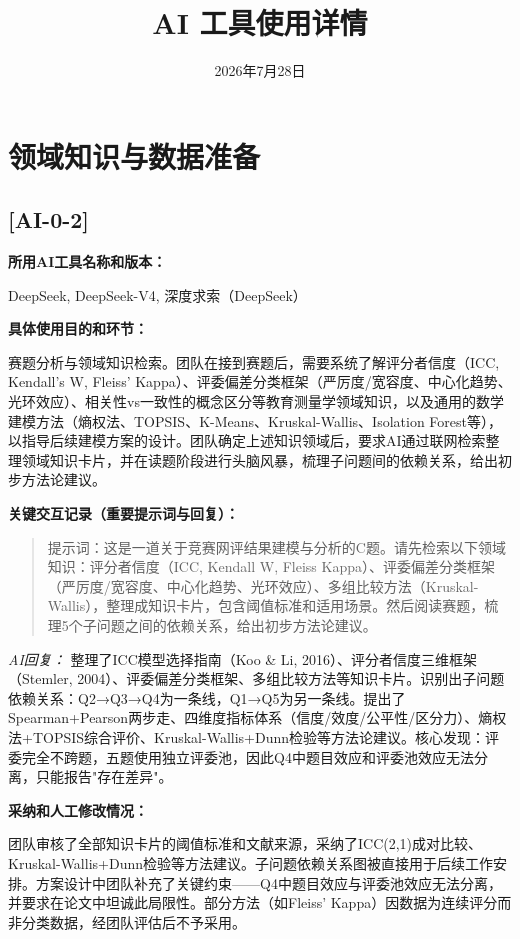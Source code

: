 \documentclass[12pt,a4paper]{ctexart}
\title{AI 工具使用详情}
\author{}
\date{2026年7月28日}
\begin{document}
\maketitle

\section*{领域知识与数据准备}

\subsection*{[AI-0-2]}

\textbf{所用AI工具名称和版本：}\par
DeepSeek, DeepSeek-V4, 深度求索（DeepSeek）

\textbf{具体使用目的和环节：}\par
赛题分析与领域知识检索。团队在接到赛题后，需要系统了解评分者信度（ICC, Kendall's W, Fleiss' Kappa）、评委偏差分类框架（严厉度/宽容度、中心化趋势、光环效应）、相关性vs一致性的概念区分等教育测量学领域知识，以及通用的数学建模方法（熵权法、TOPSIS、K-Means、Kruskal-Wallis、Isolation Forest等），以指导后续建模方案的设计。团队确定上述知识领域后，要求AI通过联网检索整理领域知识卡片，并在读题阶段进行头脑风暴，梳理子问题间的依赖关系，给出初步方法论建议。

\textbf{关键交互记录（重要提示词与回复）：}\par

\begin{quote}
提示词：这是一道关于竞赛网评结果建模与分析的C题。请先检索以下领域知识：评分者信度（ICC, Kendall W, Fleiss Kappa）、评委偏差分类框架（严厉度/宽容度、中心化趋势、光环效应）、多组比较方法（Kruskal-Wallis），整理成知识卡片，包含阈值标准和适用场景。然后阅读赛题，梳理5个子问题之间的依赖关系，给出初步方法论建议。
\end{quote}

\textit{AI回复：} 整理了ICC模型选择指南（Koo \& Li, 2016）、评分者信度三维框架（Stemler, 2004）、评委偏差分类框架、多组比较方法等知识卡片。识别出子问题依赖关系：Q2→Q3→Q4为一条线，Q1→Q5为另一条线。提出了Spearman+Pearson两步走、四维度指标体系（信度/效度/公平性/区分力）、熵权法+TOPSIS综合评价、Kruskal-Wallis+Dunn检验等方法论建议。核心发现：评委完全不跨题，五题使用独立评委池，因此Q4中题目效应和评委池效应无法分离，只能报告"存在差异"。

\textbf{采纳和人工修改情况：}\par
团队审核了全部知识卡片的阈值标准和文献来源，采纳了ICC(2,1)成对比较、Kruskal-Wallis+Dunn检验等方法建议。子问题依赖关系图被直接用于后续工作安排。方案设计中团队补充了关键约束——Q4中题目效应与评委池效应无法分离，并要求在论文中坦诚此局限性。部分方法（如Fleiss' Kappa）因数据为连续评分而非分类数据，经团队评估后不予采用。
\end{document}
